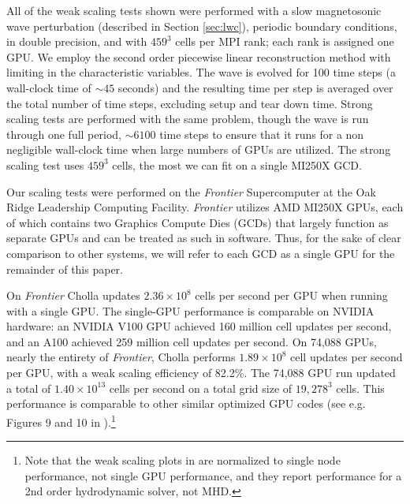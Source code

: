 \documentclass[modern]{aastex631}
\begin{document}
All of the weak scaling tests shown were performed with a slow magnetosonic wave perturbation (described in Section \ref{sec:lwc}), periodic boundary conditions, in double precision, and with $459^3$ cells per MPI rank; each rank is assigned one GPU. We employ the second order piecewise linear reconstruction method with limiting in the characteristic variables. The wave is evolved for 100 time steps (a wall-clock time of $\sim45$ seconds) and the resulting time per step is averaged over the total number of time steps, excluding setup and tear down time. Strong scaling tests are performed with the same problem, though the wave is run through one full period, $\sim 6100$ time steps to ensure that it runs for a non negligible wall-clock time when large numbers of GPUs are utilized. The strong scaling test uses $459^3$ cells, the most we can fit on a single MI250X GCD.

Our scaling tests were performed on the \textit{Frontier} Supercomputer at the Oak Ridge Leadership Computing Facility. \textit{Frontier} utilizes AMD MI250X GPUs, each of which contains two Graphics Compute Dies (GCDs) that largely function as separate GPUs and can be treated as such in software. Thus, for the sake of clear comparison to other systems, we will refer to each GCD as a single GPU for the remainder of this paper.

On \textit{Frontier} Cholla updates $2.36\times10^8$ cells per second per GPU when running with a single GPU. The single-GPU performance is comparable on NVIDIA hardware: an NVIDIA V100 GPU achieved 160 million cell updates per second, and an A100 achieved 259 million cell updates per second. On 74,088 GPUs, nearly the entirety of \textit{Frontier}, Cholla performs $1.89\times10^8$ cell updates per second per GPU, with a weak scaling efficiency of 82.2\%. The 74,088 GPU run updated a total of $1.40\times10^{13}$ cells per second on a total grid size of $19,278^3$ cells. This performance is comparable to other similar optimized GPU codes (see e.g. Figures 9 and 10 in \cite{parthenon_2023}).\footnote{Note that the weak scaling plots in \cite{parthenon_2023} are normalized to single node performance, not single GPU performance, and they report performance for a 2nd order hydrodynamic solver, not MHD.}
\end{document}
